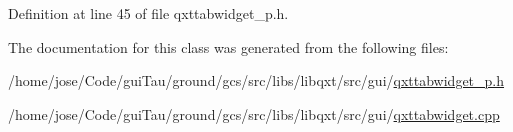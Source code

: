 Definition at line 45 of file qxttabwidget\-\_\-p.\-h.



The documentation for this class was generated from the following files\-:\begin{DoxyCompactItemize}
\item 
/home/jose/\-Code/gui\-Tau/ground/gcs/src/libs/libqxt/src/gui/\hyperlink{qxttabwidget__p_8h}{qxttabwidget\-\_\-p.\-h}\item 
/home/jose/\-Code/gui\-Tau/ground/gcs/src/libs/libqxt/src/gui/\hyperlink{qxttabwidget_8cpp}{qxttabwidget.\-cpp}\end{DoxyCompactItemize}
